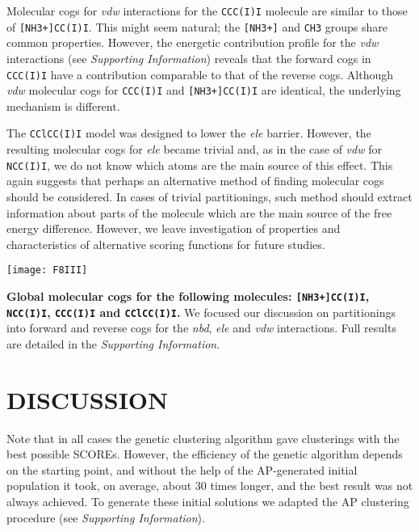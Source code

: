 {Molecular cogs for \emph{vdw} interactions for the \texttt{CCC(I)I} molecule are similar to those of \texttt{[NH3+]CC(I)I}.
This might seem natural; the \texttt{[NH3+]} and \texttt{CH3} groups share common properties.
However, the energetic contribution profile for the \emph{vdw} interactions (see \emph{Supporting Information}) reveals that the forward cogs in \texttt{CCC(I)I} have a contribution comparable to that of the reverse cogs.
Although \emph{vdw} molecular cogs for \texttt{CCC(I)I} and \texttt{[NH3+]CC(I)I} are identical, the underlying mechanism is different.

The \texttt{CClCC(I)I} model was designed to lower the \emph{ele} barrier.
However, the resulting molecular cogs for \emph{ele} became trivial and, as in the case of \emph{vdw} for \texttt{NCC(I)I}, we do not know which atoms are the main source of this effect.
This again suggests that perhaps an alternative method of finding molecular cogs should be considered.
In cases of trivial partitionings, such method should extract information about parts of the molecule which are the main source of the free energy difference. 
However, we leave investigation of properties and characteristics of alternative scoring functions for future studies.

{
\centering
\begin{table}
\centering
\texttt{[image: F8III]}
\caption{{\bf Global molecular cogs for the following molecules: \texttt{[NH3+]CC(I)I}, \texttt{NCC(I)I}, \texttt{CCC(I)I} and \texttt{CClCC(I)I}.}
We focused our discussion on partitionings into forward and reverse cogs for the \emph{nbd}, \emph{ele} and \emph{vdw} interactions.
Full results are detailed in the \emph{Supporting Information}.
}
\label{tab:molecularCogs}
\end{table}
}
}

\section*{\sffamily \Large DISCUSSION}

Note that in all cases the genetic clustering algorithm gave clusterings with the best possible SCOREs.
However, the efficiency of the genetic algorithm depends on the starting point, and without the help of the AP-generated initial population it took, on average, about 30 times longer, and the best result was not always achieved.
To generate these initial solutions we adapted the AP clustering procedure (see \emph{Supporting Information}).

